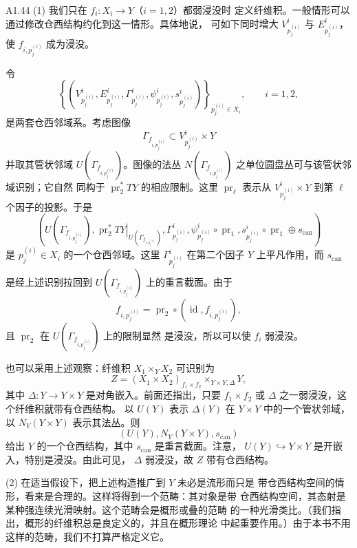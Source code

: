 \begin{remark}{A1.44}\label{rem:a1-44}
\textup{(1)} 我们只在 $f_i\colon X_i\to Y$（$i=1,2$）都弱浸没时
定义纤维积。一般情形可以通过修改仓西结构约化到这一情形。具体地说，
可如下同时增大 $V_{p_j^{(i)}}^i$ 与 $E_{p_j^{(i)}}^i$，使
$f_{i,p_j^{(i)}}$ 成为浸没。

令
\[
 \left\{
 (V_{p_j^{(i)}}^i,E_{p_j^{(i)}}^i,\Gamma_{p_j^{(i)}}^i,
  \psi_{p_j^{(i)}}^i,s_{p_j^{(i)}}^i)
 \right\}_{p_j^{(i)}\in X_i},
 \qquad i=1,2,
\]
是两套仓西邻域系。考虑图像
\[
 \Gamma_{f_{i,p_j^{(i)}}}
 \subset V_{p_j^{(i)}}^i\times Y
\]
并取其管状邻域 $U(\Gamma_{f_{i,p_j^{(i)}}})$。图像的法丛
$N(\Gamma_{f_{i,p_j^{(i)}}})$ 之单位圆盘丛可与该管状邻域识别；它自然
同构于 $\operatorname{pr}_2^*TY$ 的相应限制。这里
$\operatorname{pr}_\ell$ 表示从 $V_{p_j^{(i)}}^i\times Y$ 到第 $\ell$
个因子的投影。于是
\[
 \left(
 U(\Gamma_{f_{i,p_j^{(i)}}}),
 \left.\operatorname{pr}_2^*TY\right|_{U(\Gamma_{f_{i,p_j^{(i)}}})},
 \Gamma_{p_j^{(i)}}^i,
 \psi_{p_j^{(i)}}^i\circ\operatorname{pr}_1,
 s_{p_j^{(i)}}^i\circ\operatorname{pr}_1\oplus s_{\mathrm{can}}
 \right)
\]
是 $p_j^{(i)}\in X_i$ 的一个仓西邻域。这里
$\Gamma_{p_j^{(i)}}^i$ 在第二个因子 $Y$ 上平凡作用，而
$s_{\mathrm{can}}$ 是经上述识别拉回到
$U(\Gamma_{f_{i,p_j^{(i)}}})$ 上的重言截面。由于
\[
 f_{i,p_j^{(i)}}
 =\operatorname{pr}_2\circ(\operatorname{id},f_{i,p_j^{(i)}}),
\]
且 $\operatorname{pr}_2$ 在 $U(\Gamma_{f_{i,p_j^{(i)}}})$ 上的限制显然
是浸没，所以可以使 $f_i$ 弱浸没。

也可以采用上述观察：纤维积 $X_1\times_YX_2$ 可识别为
\[
 Z=(X_1\times X_2)_{f_1\times f_2}\!\times_{Y\times Y,\Delta}Y,
\]
其中 $\Delta\colon Y\to Y\times Y$ 是对角嵌入。前面还指出，只要
$f_1\times f_2$ 或 $\Delta$ 之一弱浸没，这个纤维积就带有仓西结构。
以 $U(Y)$ 表示 $\Delta(Y)$ 在 $Y\times Y$ 中的一个管状邻域，以
$N_Y(Y\times Y)$ 表示其法丛。则
\[
 (U(Y),N_Y(Y\times Y),s_{\mathrm{can}})
\]
给出 $Y$ 的一个仓西结构，其中 $s_{\mathrm{can}}$ 是重言截面。注意，
$U(Y)\hookrightarrow Y\times Y$ 是开嵌入，特别是浸没。由此可见，
$\Delta$ 弱浸没，故 $Z$ 带有仓西结构。

\textup{(2)} 在适当假设下，把上述构造推广到 $Y$ 未必是流形而只是
带仓西结构空间的情形，看来是合理的。这样将得到一个范畴：其对象是带
仓西结构空间，其态射是某种强连续光滑映射。这个范畴会是概形或叠的范畴
的一种光滑类比。（我们指出，概形的纤维积总是良定义的，并且在概形理论
中起重要作用。）由于本书不用这样的范畴，我们不打算严格定义它。
\end{remark}

